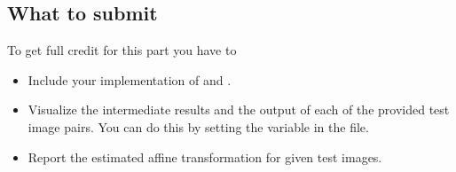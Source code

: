 \subsection{What to submit}
To get full credit for this part you have to
\begin{itemize}
\item Include your implementation of  and .
\item Visualize the intermediate results and the output of each of the provided test image pairs. You can do this by setting the  variable in the  file.
\item Report the estimated affine transformation for given test images.
\end{itemize}







 
